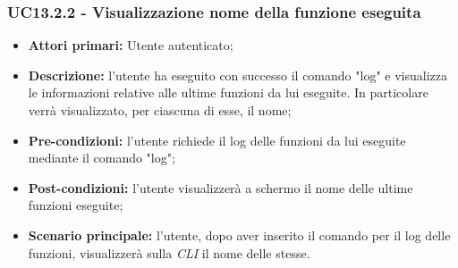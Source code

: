 \subsubsection{UC13.2.2 - Visualizzazione nome della funzione eseguita}
\begin{itemize}
	\item \textbf{Attori primari:} Utente autenticato;
	\item \textbf{Descrizione:} l'utente ha eseguito con successo il comando "log" e visualizza le informazioni relative alle ultime funzioni da lui eseguite. In particolare verrà visualizzato, per ciascuna di esse, il nome; 
	\item \textbf{Pre-condizioni:} l'utente richiede il log delle funzioni da lui eseguite mediante il comando "log"; 
	\item \textbf{Post-condizioni:} l'utente visualizzerà a schermo il nome delle ultime funzioni eseguite;
	\item \textbf{Scenario principale:} l'utente, dopo aver inserito il comando per il log delle funzioni, visualizzerà sulla \textit{CLI\glo} il nome delle stesse.
\end{itemize}